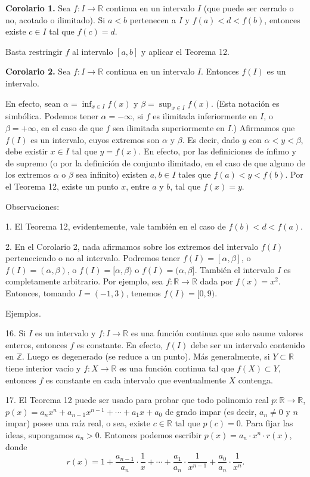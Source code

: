 \documentclass[12pt,oneside]{book}
\begin{document}
\textbf{Corolario 1.} Sea \(f: I \to \mathbb{R}\) continua en un intervalo \(I\) (que puede ser cerrado o no, acotado o ilimitado). Si \(a < b\) pertenecen a \(I\) y \(f(a) < d < f(b)\), entonces existe \(c \in I\) tal que \(f(c) = d\).

Basta restringir \(f\) al intervalo \([a, b]\) y aplicar el Teorema 12.

\textbf{Corolario 2.} Sea \(f: I \to \mathbb{R}\) continua en un intervalo \(I\). Entonces \(f(I)\) es un intervalo.

En efecto, sean \(\alpha = \inf_{x \in I} f(x)\) y \(\beta = \sup_{x \in I} f(x)\). (Esta notación es simbólica. Podemos tener \(\alpha = -\infty\), si \(f\) es ilimitada inferiormente en \(I\), o \(\beta = +\infty\), en el caso de que \(f\) sea ilimitada superiormente en \(I\).) Afirmamos que \(f(I)\) es un intervalo, cuyos extremos son \(\alpha\) y \(\beta\). Es decir, dado \(y\) con \(\alpha < y < \beta\), debe existir \(x \in I\) tal que \(y = f(x)\). En efecto, por las definiciones de ínfimo y de supremo (o por la definición de conjunto ilimitado, en el caso de que alguno de los extremos \(\alpha\) o \(\beta\) sea infinito) existen \(a, b \in I\) tales que \(f(a) < y < f(b)\). Por el Teorema 12, existe un punto \(x\), entre \(a\) y \(b\), tal que \(f(x) = y\).

Observaciones:

1. El Teorema 12, evidentemente, vale también en el caso de \(f(b) < d < f(a)\).

2. En el Corolario 2, nada afirmamos sobre los extremos del intervalo \(f(I)\) perteneciendo o no al intervalo. Podremos tener \(f(I) = [\alpha, \beta]\), o \(f(I) = (\alpha, \beta)\), o \(f(I) = [\alpha, \beta)\) o \(f(I) = (\alpha, \beta]\). También el intervalo \(I\) es completamente arbitrario. Por ejemplo, sea \(f: \mathbb{R} \to \mathbb{R}\) dada por \(f(x) = x^2\). Entonces, tomando \(I = (-1, 3)\), tenemos \(f(I) = [0, 9)\).

Ejemplos.

16. Si \(I\) es un intervalo y \(f: I \to \mathbb{R}\) es una función continua que solo asume valores enteros, entonces \(f\) es constante. En efecto, \(f(I)\) debe ser un intervalo contenido en \(\mathbb{Z}\). Luego es degenerado (se reduce a un punto). Más generalmente, si \(Y \subset \mathbb{R}\) tiene interior vacío y \(f: X \to \mathbb{R}\) es una función continua tal que \(f(X) \subset Y\), entonces \(f\) es constante en cada intervalo que eventualmente \(X\) contenga.

17. El Teorema 12 puede ser usado para probar que todo polinomio real \(p: \mathbb{R} \to \mathbb{R}\), \(p(x) = a_n x^n + a_{n-1} x^{n-1} + \cdots + a_1 x + a_0\) de grado impar (es decir, \(a_n \neq 0\) y \(n\) impar) posee una raíz real, o sea, existe \(c \in \mathbb{R}\) tal que \(p(c) = 0\). Para fijar las ideas, supongamos \(a_n > 0\). Entonces podemos escribir \(p(x) = a_n \cdot x^n \cdot r(x)\), donde
\[
r(x) = 1 + \frac{a_{n-1}}{a_n} \cdot \frac{1}{x} + \cdots + \frac{a_1}{a_n} \cdot \frac{1}{x^{n-1}} + \frac{a_0}{a_n} \cdot \frac{1}{x^n}.
\]
\end{document}
